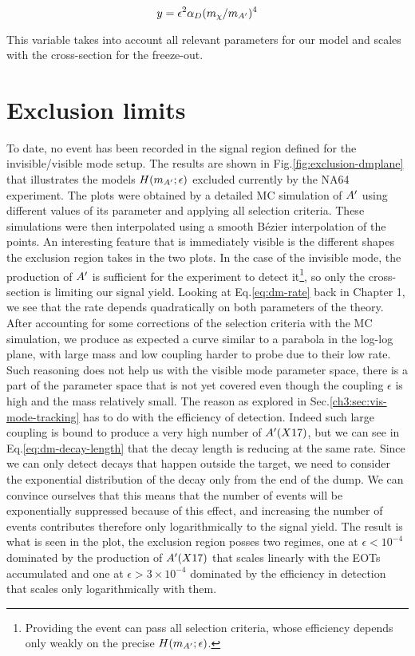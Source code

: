 \begin{equation}
  \label{eq:y-dm}
  y = \epsilon^2 \alpha_D (m_{\chi}/m_{A'})^4
\end{equation}

This variable takes into account all relevant parameters for our model and scales with the cross-section for the freeze-out.


\section{Exclusion limits}
\label{ch4:sec:exclusion limits}

To date, no event has been recorded in the signal region defined for the invisible/visible mode setup. The results are shown in Fig.\ref{fig:exclusion-dmplane} that illustrates the models $H(m_{A'};\epsilon)$ excluded currently by the NA64 experiment. The plots were obtained by a detailed MC simulation of $A'$ using different values of its parameter and applying all selection criteria. These simulations were then interpolated using a smooth Bézier interpolation of the points. An interesting feature that is immediately visible is the different shapes the exclusion region takes in the two plots. In the case of the invisible mode, the production of $A'$ is sufficient for the experiment to detect it\footnote{Providing the event can pass all selection criteria, whose efficiency depends only weakly on the precise $H(m_{A'};\epsilon)$.}, so only the cross-section is limiting our signal yield. Looking at Eq.\ref{eq:dm-rate} back in Chapter 1, we see that the rate depends quadratically on both parameters of the theory. After accounting for some corrections of the selection criteria with the MC simulation, we produce as expected a curve similar to a parabola in the log-log plane, with large mass and low coupling harder to probe due to their low rate. Such reasoning does not help us with the visible mode parameter space, there is a part of the parameter space that is not yet covered even though the coupling $\epsilon$ is high and the mass relatively small. The reason as explored in Sec.\ref{ch3:sec:vis-mode-tracking} has to do with the efficiency of detection. Indeed such large coupling is bound to produce a very high number of $A'(X17)$, but we can see in Eq.\ref{eq:dm-decay-length} that the decay length is reducing at the same rate. Since we can only detect decays that happen outside the target, we need to consider the exponential distribution of the decay only from the end of the dump. We can convince ourselves that this means that the number of events will be exponentially suppressed because of this effect, and increasing the number of events contributes therefore only logarithmically to the signal yield. The result is what is seen in the plot, the exclusion region posses two regimes, one at $\epsilon < 10^{-4}$ dominated by the production of $A'(X17)$ that scales linearly with the EOTs accumulated and one at $\epsilon > 3 \times 10^{-4}$ dominated by the efficiency in detection that scales only logarithmically with them.

